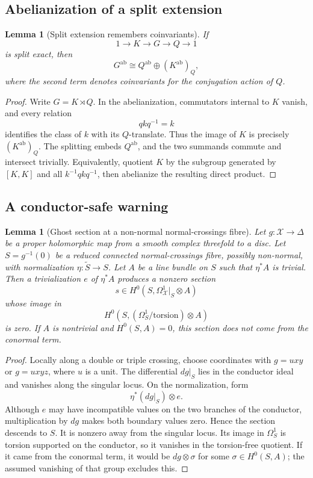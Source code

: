 \documentclass[11pt,reqno]{amsart}
\numberwithin{equation}{section}
\newtheorem{lemma}[theorem]{Lemma}
\theoremstyle{definition}
\begin{document}
\subsection{Abelianization of a split extension}

\begin{lemma}[Split extension remembers coinvariants]\label{lem:split-extension}
If
\[
1\longrightarrow K\longrightarrow G\longrightarrow Q\longrightarrow1
\]
is split exact, then
\[
G^{\mathrm{ab}}\cong Q^{\mathrm{ab}}\oplus(K^{\mathrm{ab}})_Q,
\]
where the second term denotes coinvariants for the conjugation action of $Q$.
\end{lemma}

\begin{proof}
Write $G=K\rtimes Q$. In the abelianization, commutators internal to $K$ vanish, and every relation
\[
qkq^{-1}=k
\]
identifies the class of $k$ with its $Q$-translate. Thus the image of $K$ is precisely $(K^{\mathrm{ab}})_Q$. The splitting embeds $Q^{\mathrm{ab}}$, and the two summands commute and intersect trivially. Equivalently, quotient $K$ by the subgroup generated by $[K,K]$ and all $k^{-1}qkq^{-1}$, then abelianize the resulting direct product.
\end{proof}

\subsection{A conductor-safe warning}

\begin{lemma}[Ghost section at a non-normal normal-crossings fibre]\label{lem:ghost}
Let $g:\mathcal X\to\Delta$ be a proper holomorphic map from a smooth complex threefold to a disc. Let $S=g^{-1}(0)$ be a reduced connected normal-crossings fibre, possibly non-normal, with normalization $\eta:\widetilde S\to S$. Let $A$ be a line bundle on $S$ such that $\eta^*A$ is trivial. Then a trivialization $e$ of $\eta^*A$ produces a nonzero section
\[
s\in H^0(S,\Omega^1_{\mathcal X}|_S\otimes A)
\]
whose image in
\[
H^0(S,(\Omega_S^1/\mathrm{torsion})\otimes A)
\]
is zero. If $A$ is nontrivial and $H^0(S,A)=0$, this section does not come from the conormal term.
\end{lemma}

\begin{proof}
Locally along a double or triple crossing, choose coordinates with $g=uxy$ or $g=uxyz$, where $u$ is a unit. The differential $dg|_S$ lies in the conductor ideal and vanishes along the singular locus. On the normalization, form
\[
\eta^*(dg|_S)\otimes e.
\]
Although $e$ may have incompatible values on the two branches of the conductor, multiplication by $dg$ makes both boundary values zero. Hence the section descends to $S$. It is nonzero away from the singular locus. Its image in $\Omega_S^1$ is torsion supported on the conductor, so it vanishes in the torsion-free quotient. If it came from the conormal term, it would be $dg\otimes\sigma$ for some $\sigma\in H^0(S,A)$; the assumed vanishing of that group excludes this.
\end{proof}
\end{document}
